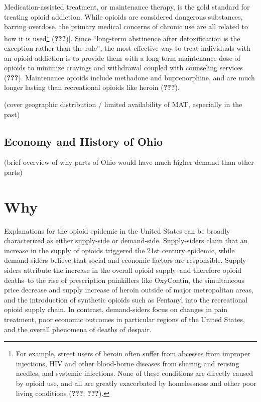 \documentclass[12pt,twoside]{reedthesis}
\begin{document}
Medication-assisted treatment, or maintenance therapy, is the gold standard for treating opioid addiction. While opioids are considered dangerous substances, barring overdose, the primary medical concerns of chronic use are all related to how it is used\footnote{For example, street users of heroin often suffer from abcesses from improper injections, HIV and other blood-borne diseases from sharing and reusing needles, and systemic infections. None of these conditions are directly caused by opioid use, and all are greatly exacerbated by homelessness and other poor living conditions ({\textbf{???}}; {\textbf{???}}).} ({\textbf{???}}){]}. Since ``long-term abstinence after detoxification is the exception rather than the rule'', the most effective way to treat individuals with an opioid addiction is to provide them with a long-term maintenance dose of opioids to minimize cravings and withdrawal coupled with counseling services ({\textbf{???}}). Maintenance opioids include methadone and buprenorphine, and are much longer lasting than recreational opioids like heroin ({\textbf{???}}).

(cover geographic distribution / limited availability of MAT, especially in the past)

\hypertarget{economy-and-history-of-ohio}{%
\section{Economy and History of Ohio}\label{economy-and-history-of-ohio}}

(brief overview of why parts of Ohio would have much higher demand than other parts)

\hypertarget{why}{%
\chapter{Why}\label{why}}

Explanations for the opioid epidemic in the United States can be broadly characterized as either supply-side or demand-side. Supply-siders claim that an increase in the supply of opioids triggered the 21st century epidemic, while demand-siders believe that social and economic factors are responsible. Supply-siders attribute the increase in the overall opioid supply--and therefore opioid deaths--to the rise of prescription painkillers like OxyContin, the simultaneous price decrease and supply increase of heroin outside of major metropolitan areas, and the introduction of synthetic opioids such as Fentanyl into the recreational opioid supply chain. In contrast, demand-siders focus on changes in pain treatment, poor economic outcomes in particular regions of the United States, and the overall phenomena of deaths of despair.
\end{document}
